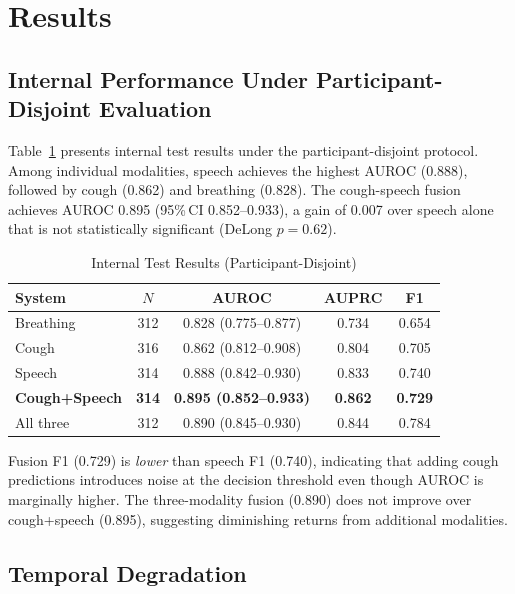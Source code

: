 \documentclass[conference]{IEEEtran}
\begin{document}
\section{Results}
\label{sec:results}

\subsection{Internal Performance Under Participant-Disjoint Evaluation}

Table~\ref{tab:internal} presents internal test results under the participant-disjoint protocol. Among individual modalities, speech achieves the highest AUROC (0.888), followed by cough (0.862) and breathing (0.828). The cough-speech fusion achieves AUROC 0.895 (95\%\,CI 0.852--0.933), a gain of 0.007 over speech alone that is not statistically significant (DeLong $p{=}0.62$).

\begin{table}[!t]
\centering
\caption{Internal Test Results (Participant-Disjoint)}
\label{tab:internal}
\footnotesize
\begin{tabular}{@{}lcccc@{}}
\toprule
System & $N$ & AUROC & AUPRC & F1 \\
\midrule
Breathing      & 312 & 0.828 (0.775--0.877) & 0.734 & 0.654 \\
Cough          & 316 & 0.862 (0.812--0.908) & 0.804 & 0.705 \\
Speech         & 314 & 0.888 (0.842--0.930) & 0.833 & 0.740 \\
\midrule
\textbf{Cough+Speech} & \textbf{314} & \textbf{0.895 (0.852--0.933)} & \textbf{0.862} & \textbf{0.729} \\
All three      & 312 & 0.890 (0.845--0.930) & 0.844 & 0.784 \\
\bottomrule
\end{tabular}
\end{table}

Fusion F1 (0.729) is \emph{lower} than speech F1 (0.740), indicating that adding cough predictions introduces noise at the decision threshold even though AUROC is marginally higher. The three-modality fusion (0.890) does not improve over cough+speech (0.895), suggesting diminishing returns from additional modalities.

\subsection{Temporal Degradation}
\end{document}
